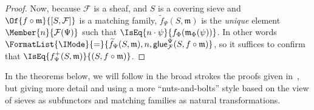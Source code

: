 \documentclass{article}
\newcommand\AreEq[1]{\FormatList{\IMode}{=}{#1}}
\newcommand\Plus[1]{{#1}^+}
\begin{document}
\begin{proof}
  Now, because $\mathcal{F}$ is a sheaf, and $S$ is a covering sieve
  and $\Of{f\circ\mathfrak{m}}{[S,\mathcal{F}]}$ is a matching family,
  $\widetilde{f}_\Psi(S,\mathfrak{m})$ is the \emph{unique} element
  $\Member{n}{\mathcal{F}(\Psi)}$ such that
  $\IsEq{n\cdot\psi}{f_\Phi(\mathfrak{m}_\Phi(\psi))}$.  In other
  words
  $\AreEq{{\widetilde{f}_\Psi(S,\mathfrak{m})}, n,
    {\Glue{\mathcal{F}}^\Psi(S,f\circ\mathfrak{m})}}$, so it suffices
  to confirm that
  $\IsEq{\Plus{f}_\Psi(S,\mathfrak{m})}{(S,f\circ\mathfrak{m})}$.
\end{proof}


In the theorems below, we will follow in the broad strokes the proofs
given in~\cite{maclane-moerdijk:1992}, but giving more detail and
using a more ``nuts-and-bolts'' style based on the view of sieves as
subfunctors and matching families as natural transformations.
\end{document}
